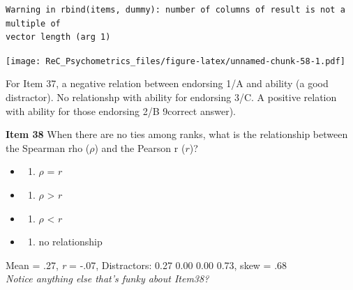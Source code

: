 \documentclass[
  english,
]{book}
\newenvironment{Shaded}{\begin{snugshade}}{\end{snugshade}}
\newcommand{\AttributeTok}[1]{\textcolor[rgb]{0.77,0.63,0.00}{#1}}
\newcommand{\DecValTok}[1]{\textcolor[rgb]{0.00,0.00,0.81}{#1}}
\newcommand{\FunctionTok}[1]{\textcolor[rgb]{0.00,0.00,0.00}{#1}}
\newcommand{\NormalTok}[1]{#1}
\newcommand{\SpecialCharTok}[1]{\textcolor[rgb]{0.00,0.00,0.00}{#1}}
\providecommand{\tightlist}{%
  \setlength{\itemsep}{0pt}\setlength{\parskip}{0pt}}
\begin{document}
\begin{verbatim}
Warning in rbind(items, dummy): number of columns of result is not a multiple of
vector length (arg 1)
\end{verbatim}

\texttt{[image: ReC\_Psychometrics\_files/figure-latex/unnamed-chunk-58-1.pdf]}

For Item 37, a negative relation between endorsing 1/A and ability (a good distractor). No relationshp with ability for endorsing 3/C. A positive relation with ability for those endorsing 2/B 9correct answer).

\textbf{Item 38} When there are no ties among ranks, what is the relationship between the Spearman rho (\(\rho\)) and the Pearson r (\(r\))?

\begin{itemize}
\item
  \begin{enumerate}
  \def\labelenumi{\alph{enumi})}
  \tightlist
  \item
    \(\rho\) = \(r\)
  \end{enumerate}
\item
  \begin{enumerate}
  \def\labelenumi{\roman{enumi})}
  \setcounter{enumi}{1}
  \tightlist
  \item
    \(\rho\) \textgreater{} \(r\)
  \end{enumerate}
\item
  \begin{enumerate}
  \def\labelenumi{\alph{enumi})}
  \tightlist
  \item
    \(\rho\) \textless{} \(r\)
  \end{enumerate}
\item
  \begin{enumerate}
  \def\labelenumi{\alph{enumi})}
  \setcounter{enumi}{1}
  \tightlist
  \item
    no relationship
  \end{enumerate}
\end{itemize}

Mean = .27, \emph{r} = -.07, Distractors: 0.27 0.00 0.00 0.73, skew = .68\\
\emph{Notice anything else that's funky about Item38?}

\begin{Shaded}
\end{Shaded}
\end{document}
